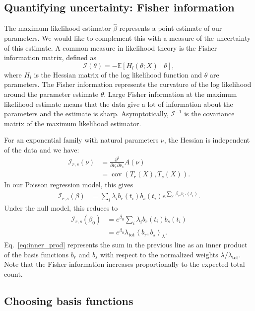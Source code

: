\documentclass[12pt, letterpaper]{article}
\newcommand{ \lambtot }{\lambda_{\text{tot}}}
\DeclareMathOperator{\cov}{cov}
\begin{document}
\subsection{Quantifying uncertainty: Fisher information}
The maximum likelihood estimator $\hat{\beta}$ represents a point estimate of our parameters.
We would like to complement this with a measure of the uncertainty of this estimate.
A common measure in likelihood theory is the Fisher information matrix, defined as
\begin{equation}
    \mathcal{I}(\theta) = - \mathbb{E}\left[H_{l}(\theta; X) \middle| \theta \right],
\end{equation}
where $H_l$ is the Hessian matrix of the log likelihood function and $\theta$ are parameters.
The Fisher information represents the curvature of the log likelihood around the parameter estimate $\theta$.
Large Fisher information at the maximum likelihood estimate means that the data give a lot of information about the parameters and the estimate is sharp.
Asymptotically, $\mathcal{I}^{-1}$ is the covariance matrix of the maximum likelihood estimator.

For an exponential family with natural parameters $\nu$, the Hessian is independent of the data and we have:
\begin{align}
    \mathcal{I}_{r,s}(\nu) &= \frac{\partial^2}{\partial \nu_r \partial \nu_s} A(\nu)\\
                           &= \cov\left(T_r(X), T_s(X)\right).
\end{align}
In our Poisson regression model, this gives
\begin{align}
    \mathcal{I}_{r,s}(\beta) &= \sum_i \lambda_i b_r(t_i) b_s(t_i) e^{\sum_{r'} \beta_{r'} b_{r'}(t_i)}.
    \label{eq:fisher_info}
\end{align}
Under the null model, this reduces to
\begin{align}
    \mathcal{I}_{r,s}(\beta_0) &= e^{\beta_0} \sum_i \lambda_i b_r(t_i) b_s(t_i) \\
                               &= e^{\beta_0} \lambtot \left< b_r, b_s \right>_\lambda. \label{eq:inner_prod}
\end{align}
Eq.~\ref{eq:inner_prod} represents the sum in the previous line as an inner product of the basis functions $b_r$ and $b_s$ with respect to the normalized weights $\lambda / \lambtot$.
Note that the Fisher information increases proportionally to the expected total count.

\subsection{Choosing basis functions}
\end{document}
